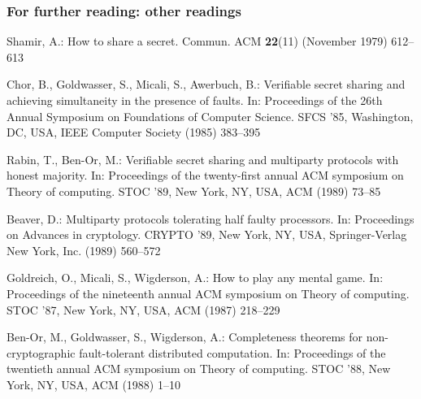 \documentclass{beamer}
\begin{document}
\begin{frame}[allowframebreaks]
  \frametitle{For further reading: other readings}
  \begin{thebibliography}{10}
    Shamir, A.:
    \newblock How to share a secret.
    \newblock Commun. ACM \textbf{22}(11) (November 1979)  612--613

    Chor, B., Goldwasser, S., Micali, S., Awerbuch, B.:
    \newblock Verifiable secret sharing and achieving simultaneity in the presence
    of faults.
    \newblock In: Proceedings of the 26th Annual Symposium on Foundations of
    Computer Science. SFCS '85, Washington, DC, USA, IEEE Computer Society (1985)
    383--395

    Rabin, T., Ben-Or, M.:
    \newblock Verifiable secret sharing and multiparty protocols with honest
    majority.
    \newblock In: Proceedings of the twenty-first annual ACM symposium on Theory of
    computing. STOC '89, New York, NY, USA, ACM (1989)  73--85

    Beaver, D.:
    \newblock Multiparty protocols tolerating half faulty processors.
    \newblock In: Proceedings on Advances in cryptology. CRYPTO '89, New York, NY,
    USA, Springer-Verlag New York, Inc. (1989)  560--572

    Goldreich, O., Micali, S., Wigderson, A.:
    \newblock How to play any mental game.
    \newblock In: Proceedings of the nineteenth annual ACM symposium on Theory of
    computing. STOC '87, New York, NY, USA, ACM (1987)  218--229

    Ben-Or, M., Goldwasser, S., Wigderson, A.:
    \newblock Completeness theorems for non-cryptographic fault-tolerant
    distributed computation.
    \newblock In: Proceedings of the twentieth annual ACM symposium on Theory of
    computing. STOC '88, New York, NY, USA, ACM (1988)  1--10
  \end{thebibliography}
\end{frame}
\end{document}

